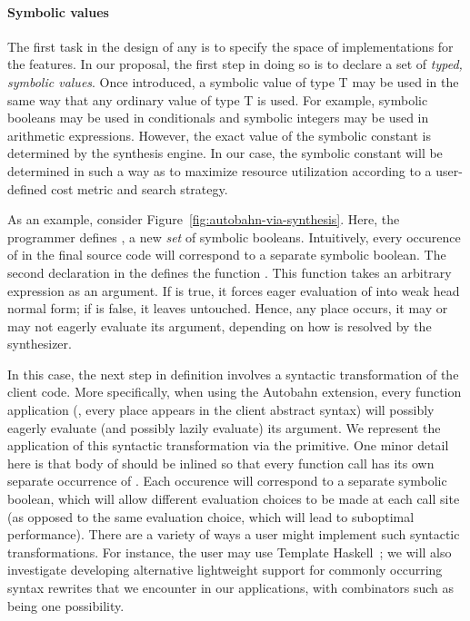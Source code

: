 \paragraph*{Symbolic values}
The first task in the design of any \rasp{} is to specify the space of
implementations for the \rasp{} features.  In our proposal, the first step
in doing so is to declare a set of \emph{typed, symbolic values}.  Once introduced, a symbolic value 
of type T may be used in the same way that any ordinary value of type T is used.
For example, symbolic booleans may be used in conditionals and symbolic integers may be used
in arithmetic expressions.  However, the exact value of the symbolic constant is
determined by the synthesis engine.  In our case, the symbolic constant will be determined 
in such a way as to maximize resource utilization according to a user-defined cost metric and 
search strategy.

As an example, consider Figure~\ref{fig:autobahn-via-synthesis}.  Here, the programmer 
defines , a new \emph{set} of symbolic booleans.  Intuitively, every occurence of 
in the final source code will correspond to a separate symbolic boolean.  The second declaration in
the \rasp{} defines the function .  This function takes an arbitrary expression 
as an argument.  If  is true, it forces eager evaluation of  into weak head normal
form; if   is false, it leaves  untouched.  Hence, any
place  occurs, it
may or may not eagerly evaluate its argument, depending on how  is resolved by the 
synthesizer.

In this case, the next step in \rasp{} definition involves a syntactic
transformation of the client code.  More specifically, when using the
Autobahn extension, every function application (\ie, every place
 appears in the client abstract syntax) will possibly
eagerly evaluate (and possibly lazily evaluate) its argument.  We
represent the application of this syntactic transformation via the
 primitive.  One minor detail here is that body of
 should be inlined so that every function call has its own
separate occurrence of .  Each occurence will correspond to a
separate symbolic boolean, which will allow different evaluation
choices to be made at each call site (as opposed to the same
evaluation choice, which will lead to suboptimal performance).  There
are a variety of ways a user might implement such syntactic
transformations.  For instance, the user may use Template
Haskell~\cite{template-haskell}; we will also investigate developing
alternative lightweight support for commonly occurring syntax rewrites
that we encounter in our applications, with combinators such as
 being one possibility.

